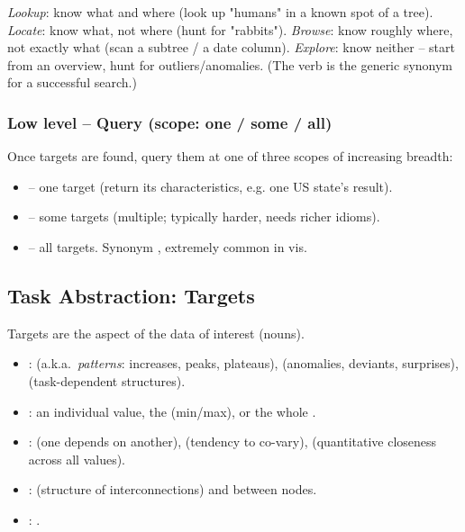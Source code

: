 \noindent\emph{Lookup}: know what and where (look up "humans" in a known spot of a tree). \emph{Locate}: know what, not where (hunt for "rabbits"). \emph{Browse}: know roughly where, not exactly what (scan a subtree / a date column). \emph{Explore}: know neither -- start from an overview, hunt for outliers/anomalies. (The verb  is the generic synonym for a successful search.)

\subsubsection{Low level -- Query (scope: one / some / all)}
Once targets are found, query them at one of three scopes of increasing breadth:
\begin{itemize}
  \item {} -- one target (return its characteristics, e.g. one US state's result).
  \item {} -- some targets (multiple; typically harder, needs richer idioms).
  \item {} -- all targets. Synonym , extremely common in vis.
\end{itemize}

\subsection{Task Abstraction: Targets}
Targets are the aspect of the data of interest (nouns).
\begin{itemize}
  \item {}:  (a.k.a.\ \emph{patterns}: increases, peaks, plateaus),  (anomalies, deviants, surprises),  (task-dependent structures).
  \item {}: an individual value, the  (min/max), or the whole .
  \item {}:  (one depends on another),  (tendency to co-vary),  (quantitative closeness across all values).
  \item {}:  (structure of interconnections) and  between nodes.
  \item {}: .
\end{itemize}

